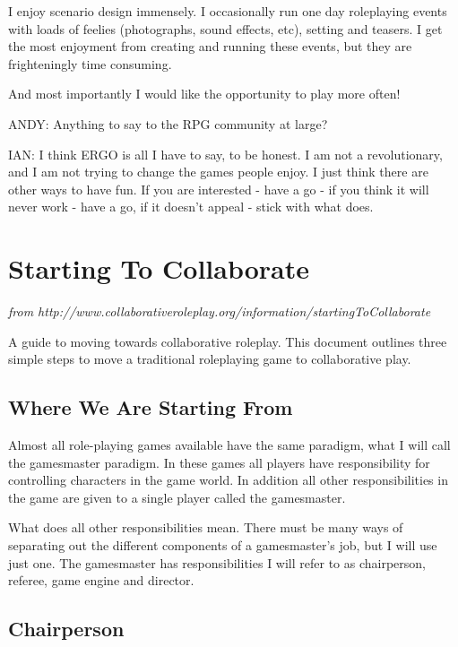 \documentclass[twoside]{book}
\begin{document}
\begin{description}
I enjoy scenario design immensely. I occasionally run one day roleplaying events with loads of feelies (photographs, sound effects, etc), setting and teasers. I get the most enjoyment from creating and running these events, but they are frighteningly time consuming.

And most importantly I would like the opportunity to play more often!

\item{ANDY:} Anything to say to the RPG community at large?

\item{IAN:} I think ERGO is all I have to say, to be honest. I am not a revolutionary, and I am not trying to change the games people enjoy. I just think there are other ways to have fun. If you are interested - have a go - if you think it will never work - have a go, if it doesn't appeal - stick with what does.
\end{description}





\chapter{Starting To Collaborate}
{\it from http://www.collaborativeroleplay.org/information/startingToCollaborate}

A guide to moving towards collaborative roleplay. This document outlines three simple steps to move a traditional roleplaying game to collaborative play.

\section{Where We Are Starting From}

Almost all role-playing games available have the same paradigm, what I will call the gamesmaster paradigm. In these games all players have responsibility for controlling characters in the game world. In addition all other responsibilities in the game are given to a single player called the gamesmaster.

What does all other responsibilities mean. There must be many ways of separating out the different components of a gamesmaster's job, but I will use just one. The gamesmaster has responsibilities I will refer to as chairperson, referee, game engine and director.

\section{Chairperson}
\end{document}
